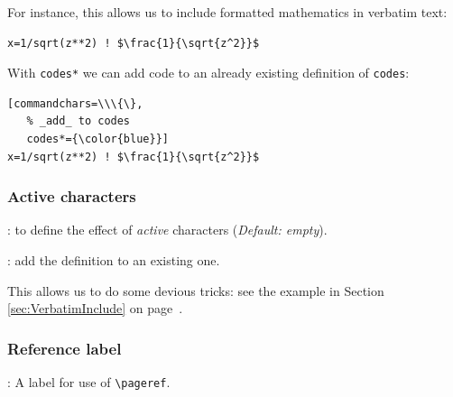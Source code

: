 \documentclass[twoside]{article}
\providecommand\optname[1]{\textsf{#1}}
\newenvironment{optlist}{\begin{description}%
  \renewcommand\makelabel[1]{%
    \descriptionlabel{\mdseries\optname{##1}}}%
  \itemsep0.25\itemsep}%
 {\end{description}}
\begin{document}
  For instance, this allows us to include formatted mathematics in verbatim
text:

{%
\begin{SideBySideExample}
\begin{Verbatim}[commandchars=\\\{\},
         codes={\catcode`$=3\catcode`^=7}]
    x=1/sqrt(z**2) ! $\frac{1}{\sqrt{z^2}}$
\end{Verbatim}
\end{SideBySideExample}
}  %


With \verb|codes*| we can add code to an already existing definition of \Verb|codes|:

{%
\begin{SideBySideExample}
\begin{Verbatim}[commandchars=\\\{\},
   % _add_ to codes
   codes*={\color{blue}}]
x=1/sqrt(z**2) ! $\frac{1}{\sqrt{z^2}}$
\end{Verbatim}
\end{SideBySideExample}
}  %






\subsubsection{Active characters}

\begin{optlist}
  \item[defineactive (macro)]: to define the effect of \emph{active}
  characters
  (\emph{Default: empty}).
  \item[defineactive* (macro)]: add the definition to an existing one.
\end{optlist}

  This allows us to do some devious tricks: see the example in Section
\ref{sec:VerbatimInclude} on page~\pageref{sec:VerbatimInclude}.


\subsubsection{Reference label}

\begin{optlist}
  \item[reflabel (<label>)]: A  label for use of \verb|\pageref|.
\end{optlist}
\end{document}
